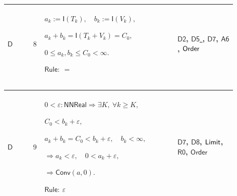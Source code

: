 \documentclass[12pt,reqno]{amsart}
\theoremstyle{blueplain}
\numberwithin{equation}{section}
\begin{document}
{\scriptsize \setlength{\parskip}{0pt}\nointerlineskip
\noindent 
\begin{tabular}{|@{}>{\centering\arraybackslash}m{0.10658\linewidth}|>{\centering\arraybackslash}m{0.03553\linewidth}|>{\centering\arraybackslash}m{0.52105\linewidth}|>{\centering\arraybackslash}m{0.23684\linewidth}|}
\hline
\hypertarget{dct:D8}{$\displaystyle \mathsf{D}$} & $\displaystyle 8$ & $%
\displaystyle a_k:=\mathsf{I}(T_k),\quad b_k:=\mathsf{I}(V_k),$\par$%
\displaystyle a_k+b_k=\mathsf{I}(T_k+V_k)=C_0,$\par$\displaystyle 0\le
a_k,b_k\le C_0<\infty.$\par$\displaystyle \mathsf{Rule}:\ =$ & \hyperlink{dct:D2}%
{$\displaystyle \mathsf{D2}$}, \hyperlink{dct:D5}{$\displaystyle \mathsf{D5}$%
}, \hyperlink{dct:D7}{$\displaystyle \mathsf{D7}$}, \hyperlink{dct:A6}{$%
\displaystyle \mathsf{A6}$}, \hyperlink{ax:Order}{$\displaystyle \mathsf{%
Order}$} \\ \hline
\end{tabular}%
}

{\scriptsize \setlength{\parskip}{0pt}\nointerlineskip
\noindent 
\begin{tabular}{|@{}>{\centering\arraybackslash}m{0.10658\linewidth}|>{\centering\arraybackslash}m{0.03553\linewidth}|>{\centering\arraybackslash}m{0.52105\linewidth}|>{\centering\arraybackslash}m{0.23684\linewidth}|}
\hline
\hypertarget{dct:D9}{$\displaystyle \mathsf{D}$} & $\displaystyle 9$ & $%
\displaystyle 0<\varepsilon:\mathsf{NNReal}\Rightarrow\exists K,\ \forall
k\ge K,$\par$\displaystyle C_0<b_k+\varepsilon,$\par$\displaystyle %
a_k+b_k=C_0<b_k+\varepsilon,\quad b_k<\infty,$\par$\displaystyle \Rightarrow
a_k<\varepsilon,\quad0<a_k+\varepsilon,$\par$\displaystyle \Rightarrow%
\mathsf{Conv}(a,0).$\par$\displaystyle \mathsf{Rule}:\ \varepsilon$ & 
\hyperlink{dct:D7}{$\displaystyle \mathsf{D7}$}, \hyperlink{dct:D8}{$%
\displaystyle \mathsf{D8}$}, \hyperlink{def:Limit}{$\displaystyle \mathsf{%
Limit}$}, \hyperlink{dct:R0}{$\displaystyle \mathsf{R0}$}, \hyperlink{ax:Order}%
{$\displaystyle \mathsf{Order}$} \\ \hline
\end{tabular}%
}
\end{document}
